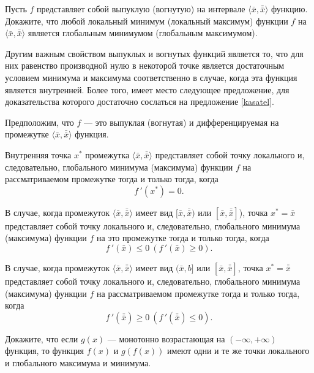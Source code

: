 \begin{exer}
    Пусть $f$ представляет собой выпуклую (вогнутую) на интервале
    $\langle \bar{x},\bar{\bar{x}} \rangle$ функцию. Докажите, что любой локальный
    минимум (локальный максимум) функции $f$ на
    $\langle \bar{x},\bar{\bar{x}} \rangle$
    является глобальным минимумом (глобальным максимумом).
\end{exer}

    Другим важным свойством выпуклых и вогнутых функций является то,
    что для них равенство производной нулю в некоторой точке является достаточным
    условием минимума и максимума соответственно в случае, когда эта функция является
    внутренней. Более того, имеет
    место следующее предложение, для доказательства которого достаточно
    сослаться на предложение  \ref{kasatel}.
\begin{prop}
    Предположим, что $f$ --- это выпуклая (вогнутая) и дифференцируемая
    на промежутке $\langle \bar{x},\bar{\bar{x}} \rangle$ функция.

    Внутренняя точка $x^{*}$ промежутка  $\langle \bar{x},\bar{\bar{x}} \rangle$
    представляет собой точку локального и,
    следовательно, глобального минимума (максимума) функции $f$ на
    рассматриваемом промежутке тогда и только тогда, когда
    \[f\,'(x^{*})=0.\]

    В случае, когда промежуток $\langle \bar{x},\bar{\bar{x}} \rangle$ имеет
    вид $[\bar{x},\bar{\bar{x}})$ или $[\bar{x},\bar{\bar{x}}]$),
    точка $x^{*}=\bar{x}$ представляет собой точку локального и,
    следовательно, глобального минимума (максимума) функции $f$ на
    это промежутке
    тогда и только тогда, когда
    \[f\,'(\bar{x})\leqslant0 \ (f\,'(\bar{x})\geqslant0 ).\]

    В случае, когда промежуток $\langle \bar{x},\bar{\bar{x}} \rangle$
    имеет вид $(\bar{x},b]$ или
    $[\bar{x},\bar{\bar{x}}]$,
    точка $x^{*}=\bar{\bar{x}}$ представляет собой точку локального и,
    следовательно, глобального минимума (максимума) функции $f$ на
    рассматриваемом промежутке
    тогда и только тогда, когда
    \[f\,'(\bar{\bar{x}})\geqslant0 \ (f\,'(\bar{\bar{x}})\leqslant0).\]
\end{prop}

\begin{exer}
    Докажите, что если $g(x)$ --- монотонно возрастающая на
    $(-\infty,+\infty)$ функция, то функция $f(x)$ и $g(f(x))$ имеют
    одни и те же точки локального и глобального максимума и минимума.
\end{exer}

